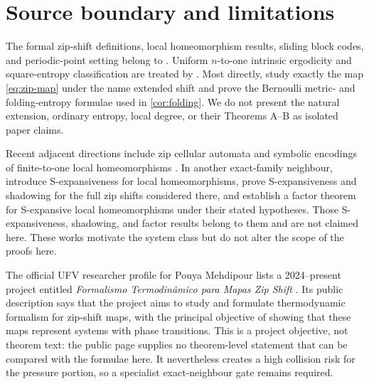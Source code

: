 \section{Source boundary and limitations}\label{sec:scope}

The formal zip-shift definitions, local homeomorphism results, sliding block
codes, and periodic-point setting belong to
\citet{LameiMehdipour2025}.  Uniform $n$-to-one intrinsic ergodicity and
square-entropy classification are treated by
\citet{MehdipourJangjooye2025}.  Most directly,
\citet{MartinsMattosVarao2026} study exactly the map \eqref{eq:zip-map} under
the name extended shift and prove the Bernoulli metric- and folding-entropy
formulae used in \cref{cor:folding}.  We do not present the natural extension,
ordinary entropy, local degree, or their Theorems A--B as isolated paper
claims.

Recent adjacent directions include zip cellular automata
\citep{MehdipourSalarinoghabiGibrim2026} and symbolic encodings of finite-to-one
local homeomorphisms \citep{MehdipourLamei2026}.  In another exact-family
neighbour, \citet{LameiMehdipourVargas2025} introduce S-expansiveness for local
homeomorphisms, prove S-expansiveness and shadowing for the full zip shifts
considered there, and establish a factor theorem for S-expansive local
homeomorphisms under their stated hypotheses.  Those S-expansiveness,
shadowing, and factor results belong to them and are not claimed here.  These
works motivate the system class but do not alter the scope of the proofs here.

The official UFV researcher profile for Pouya Mehdipour lists a 2024--present
project entitled \emph{Formalismo Termodin\^amico para Mapas Zip Shift}
\citep{MehdipourUFVProject2024}.  Its public description says that the project
aims to study and formulate thermodynamic formalism for zip-shift maps, with
the principal objective of showing that these maps represent systems with
phase transitions.  This is a project objective, not theorem text: the public
page supplies no theorem-level statement that can be compared with the
formulae here.  It nevertheless creates a high collision risk for the pressure
portion, so a specialist exact-neighbour gate remains required.

